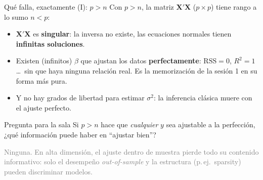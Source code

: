 \documentclass{beamer}
\newcommand{\1}{\mathbb{I}}
\newcommand{\RSS}{\mathrm{RSS}}
\begin{document}
\begin{frame}{Qué falla, exactamente (I): $p > n$}
\small
Con $p > n$, la matriz $\mathbf{X}'\mathbf{X}$ ($p \times p$) tiene rango a lo sumo $n < p$:
\begin{itemize}\itemsep5pt
  \item $\mathbf{X}'\mathbf{X}$ es \textbf{singular}: la inversa no existe, las ecuaciones normales tienen \textbf{infinitas soluciones}. \pause
  \item Existen (infinitos) $\beta$ que ajustan los datos \textbf{perfectamente}: $\RSS = 0$, $R^2 = 1$\ldots\ sin que haya ninguna relación real. Es la memorización de la sesión 1 en su forma más pura. \pause
  \item Y no hay grados de libertad para estimar $\sigma^2$: la inferencia clásica muere con el ajuste perfecto.
\end{itemize}
\pause

\vspace{0.2cm}
\begin{block}{Pregunta para la sala}
Si $p > n$ hace que \emph{cualquier} $y$ sea ajustable a la perfección, ¿qué información puede haber en ``ajustar bien''?
\end{block}
\pause
\textcolor{gray}{Ninguna. En alta dimensión, el ajuste dentro de muestra pierde todo su contenido informativo: solo el desempeño \emph{out-of-sample} y la estructura (p.\,ej.\ sparsity) pueden discriminar modelos.}
\end{frame}
\end{document}
